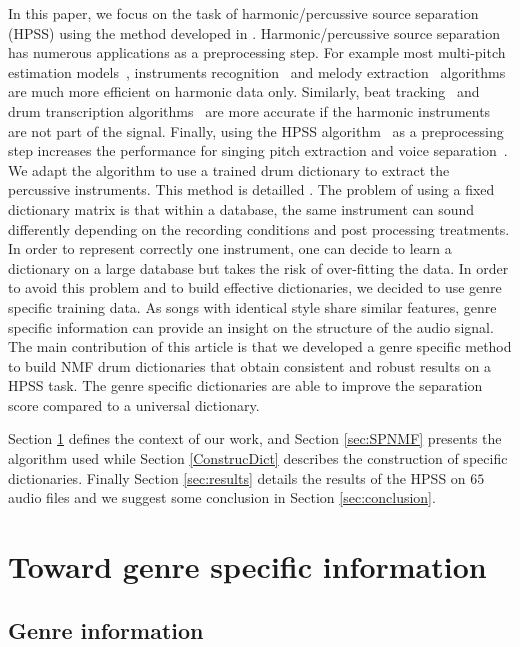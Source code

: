 \documentclass{article}
\begin{document}
In this paper, we focus on the task of harmonic/percussive source separation (HPSS) using the method developed in \cite{laroche2015structured}. 
Harmonic/percussive source separation has numerous applications as a preprocessing step. For example most multi-pitch estimation models~\cite{klapuri2008multipitch}, instruments recognition~\cite{eronen2000musical} and melody extraction~\cite{salamon2012melody} algorithms are much more efficient on harmonic data only. Similarly, beat tracking~\cite{ellis2007beat} and drum transcription algorithms~\cite{paulus2005drum} are more accurate if the harmonic instruments are not part of the signal. Finally, using the HPSS algorithm~\cite{fitzgerald2010harmonic} as a preprocessing step increases the performance for singing pitch extraction and voice separation~\cite{hsu2012tandem}. 
We adapt the algorithm to use a trained drum dictionary to extract the percussive instruments. This method is detailled \cite{larocheJournal}. 
The problem of using a fixed dictionary matrix is that within a database, the same instrument can sound differently depending on the recording conditions and post processing treatments. In order to represent correctly one instrument, one can decide to learn a dictionary on a large database but takes the risk of over-fitting the data. In order to avoid this problem and to build effective dictionaries, we decided to use genre specific training data. As songs with identical style share similar features, genre specific information can provide an insight on the structure of the audio signal.
The main contribution of this article is that we developed a genre specific method to build NMF drum dictionaries that obtain consistent and robust results on a HPSS task. The genre specific dictionaries are able to improve the separation score compared to a universal dictionary. 


Section \ref{defgenre} defines the context of our work, and Section \ref{sec:SPNMF} presents the algorithm used while Section \ref{ConstrucDict} describes the construction of specific dictionaries. Finally Section \ref{sec:results} details the results of the HPSS on $65$ audio files and  we suggest some conclusion in Section \ref{sec:conclusion}. 



\section{Toward genre specific information}\label{defgenre}

\subsection{Genre information}
\end{document}
